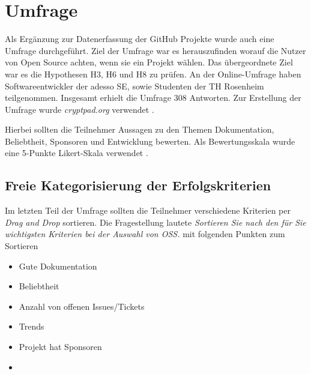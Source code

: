 \chapter{Umfrage}


Als Ergänzung zur Datenerfassung der GitHub Projekte wurde auch eine Umfrage durchgeführt.
Ziel der Umfrage war es herauszufinden worauf die Nutzer von Open Source achten, wenn sie ein Projekt
wählen. Das übergeordnete Ziel war es die Hypothesen H3, H6 und H8 zu prüfen.
An der Online-Umfrage haben Softwareentwickler der adesso SE, sowie Studenten der TH Rosenheim teilgenommen.
Insgesamt erhielt die Umfrage 308 Antworten. Zur Erstellung der Umfrage wurde \textit{cryptpad.org} 
verwendet \cite{Cryptpad_org}.

Hierbei sollten die Teilnehmer Aussagen zu den Themen Dokumentation, Beliebtheit, Sponsoren und
Entwicklung bewerten. Als Bewertungsskala wurde eine 5-Punkte Likert-Skala verwendet \cite{likertScale}.







\newpage




\newpage



\newpage %
\cleardoubleemptypage
\section{Freie Kategorisierung der Erfolgskriterien}\label{sec:umfrage_last_question}


Im letzten Teil der Umfrage sollten die Teilnehmer verschiedene Kriterien per
\textit{Drag and Drop} sortieren. Die Fragestellung lautete
\textit{Sortieren Sie nach den für Sie wichtigsten Kriterien bei der Auswahl von OSS.}
mit folgenden Punkten zum Sortieren


\begin{multicols}{2}
    \begin{itemize}
        \setlength\itemsep{0em}
        \item Gute Dokumentation
        \item Beliebtheit
        \item Anzahl von offenen Issues/Tickets
        \item Trends
        \item Projekt hat Sponsoren
        \item []
    \end{itemize}
\end{multicols}


